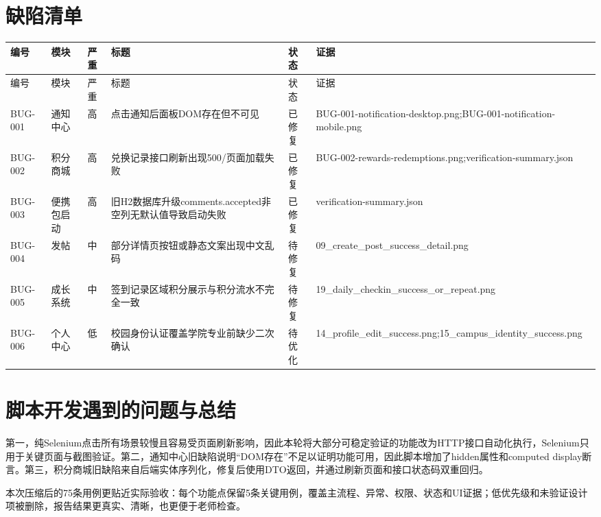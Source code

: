 \documentclass[UTF8,zihao=-4]{ctexart}
\begin{document}
\section{缺陷清单}
\begin{longtable}{P{1.4cm}P{2.2cm}P{1.1cm}P{6.2cm}P{1.6cm}P{5.5cm}}
\toprule
编号 & 模块 & 严重 & 标题 & 状态 & 证据\\
\midrule
\endfirsthead
\toprule
编号 & 模块 & 严重 & 标题 & 状态 & 证据\\
\midrule
\endhead
BUG-001 & 通知中心 & 高 & 点击通知后面板DOM存在但不可见 & 已修复 & BUG-001-notification-desktop.png;BUG-001-notification-mobile.png \\
BUG-002 & 积分商城 & 高 & 兑换记录接口刷新出现500/页面加载失败 & 已修复 & BUG-002-rewards-redemptions.png;verification-summary.json \\
BUG-003 & 便携包启动 & 高 & 旧H2数据库升级comments.accepted非空列无默认值导致启动失败 & 已修复 & verification-summary.json \\
BUG-004 & 发帖 & 中 & 部分详情页按钮或静态文案出现中文乱码 & 待修复 & 09\_create\_post\_success\_detail.png \\
BUG-005 & 成长系统 & 中 & 签到记录区域积分展示与积分流水不完全一致 & 待修复 & 19\_daily\_checkin\_success\_or\_repeat.png \\
BUG-006 & 个人中心 & 低 & 校园身份认证覆盖学院专业前缺少二次确认 & 待优化 & 14\_profile\_edit\_success.png;15\_campus\_identity\_success.png \\
\bottomrule
\end{longtable}

\section{脚本开发遇到的问题与总结}
第一，纯Selenium点击所有场景较慢且容易受页面刷新影响，因此本轮将大部分可稳定验证的功能改为HTTP接口自动化执行，Selenium只用于关键页面与截图验证。第二，通知中心旧缺陷说明“DOM存在”不足以证明功能可用，因此脚本增加了hidden属性和computed display断言。第三，积分商城旧缺陷来自后端实体序列化，修复后使用DTO返回，并通过刷新页面和接口状态码双重回归。

本次压缩后的75条用例更贴近实际验收：每个功能点保留5条关键用例，覆盖主流程、异常、权限、状态和UI证据；低优先级和未验证设计项被删除，报告结果更真实、清晰，也更便于老师检查。
\end{document}
